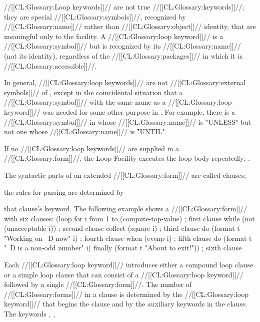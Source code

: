 
//[[CL:Glossary:Loop keywords]]// are not true //[[CL:Glossary:keywords]]//;  they are special //[[CL:Glossary:symbols]]//, recognized by //[[CL:Glossary:name]]// rather than //[[CL:Glossary:object]]// identity, that are meaningful only to the  facility. A //[[CL:Glossary:loop keyword]]// is a //[[CL:Glossary:symbol]]// but is recognized by its //[[CL:Glossary:name]]// (not its identity), regardless of the //[[CL:Glossary:packages]]// in which it is //[[CL:Glossary:accessible]]//.  

 In general, //[[CL:Glossary:loop keywords]]// are not //[[CL:Glossary:external symbols]]// of , except in the coincidental situation that a //[[CL:Glossary:symbol]]// with the same name as a //[[CL:Glossary:loop keyword]]// was needed for some other purpose in \clisp.  For example, there is a //[[CL:Glossary:symbol]]// in  whose //[[CL:Glossary:name]]// is \f{"UNLESS"} but not one whose //[[CL:Glossary:name]]// is \f{"UNTIL"}.

If no //[[CL:Glossary:loop keywords]]// are supplied in a  //[[CL:Glossary:form]]//, the Loop Facility executes the loop body repeatedly; \seesection\SimpleLoop.

\endsubsubsection%

 

The syntactic parts of an extended  //[[CL:Glossary:form]]// are called clauses; 

the rules for parsing are determined by 

that clause's keyword. The following example shows a  //[[CL:Glossary:form]]// with six clauses:
  \code
 (loop for i from 1 to (compute-top-value)       ; first clause
       while (not (unacceptable i))              ; second clause
       collect (square i)                        ; third clause
       do (format t "Working on ~D now" i)       ; fourth clause
       when (evenp i)                            ; fifth clause
         do (format t "~D is a non-odd number" i)
       finally (format t "About to exit!"))      ; sixth clause \endcode
 

Each //[[CL:Glossary:loop keyword]]// introduces  either a compound loop clause or a simple loop clause that can consist of a //[[CL:Glossary:loop keyword]]// followed by a single //[[CL:Glossary:form]]//. The number of //[[CL:Glossary:forms]]// in a clause is determined by the //[[CL:Glossary:loop keyword]]//  that begins the clause and by the auxiliary keywords in the clause. The keywords ,   ,

